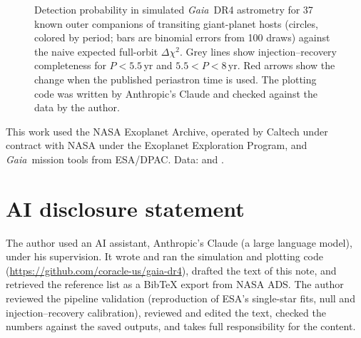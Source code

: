 \documentclass{aastex701}
\newcommand{\gaia}{\textit{Gaia}}
\begin{document}
\begin{figure}[ht!]
\caption{Detection probability in simulated \gaia\ DR4 astrometry for 37 known outer companions
of transiting giant-planet hosts (circles, colored by period; bars are binomial errors from 100
draws) against the naive expected full-orbit $\Delta\chi^2$. Grey lines show injection--recovery
completeness for $P<5.5$\,yr and $5.5<P<8$\,yr. Red arrows show the change when the published
periastron time is used. The plotting code was written by Anthropic's Claude and checked against
the data by the author.\label{fig:pred}}
\end{figure}

\begin{acknowledgments}
This work used the NASA Exoplanet Archive, operated by Caltech under contract with NASA under the
Exoplanet Exploration Program, and \gaia\ mission tools from ESA/DPAC.
Data:  and
.
\end{acknowledgments}


\section*{AI disclosure statement}
The author used an AI assistant, Anthropic's Claude (a large language model), under his
supervision. It wrote and ran the simulation and plotting code
(\url{https://github.com/coracle-us/gaia-dr4}), drafted the text of this note, and retrieved the
reference list as a BibTeX export from NASA ADS. The author reviewed the pipeline validation
(reproduction of ESA's single-star fits, null and injection--recovery calibration), reviewed and
edited the text, checked the numbers against the saved outputs, and takes full responsibility for
the content.

{}

\end{document}
